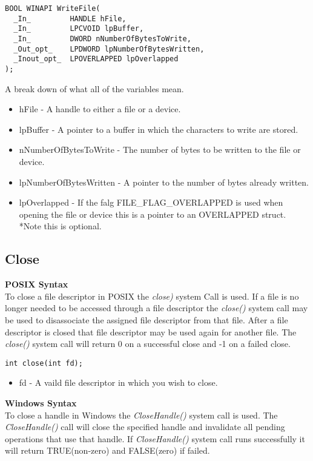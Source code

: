 \documentclass[letterpaper,10pt,notitlepage,fleqn]{article}
\begin{document}
\begin{verbatim}
BOOL WINAPI WriteFile(
  _In_         HANDLE hFile,
  _In_         LPCVOID lpBuffer,
  _In_         DWORD nNumberOfBytesToWrite,
  _Out_opt_    LPDWORD lpNumberOfBytesWritten,
  _Inout_opt_  LPOVERLAPPED lpOverlapped
);
\end{verbatim}

A break down of what all of the variables mean.

\begin{itemize}
\item hFile - A handle to either a file or a device.
\item lpBuffer - A pointer to a buffer in which the characters to write are stored.
\item nNumberOfBytesToWrite - The number of bytes to be written to the file or device.
\item lpNumberOfBytesWritten - A pointer to the number of bytes already written.
\item lpOverlapped - If the falg FILE\_FLAG\_OVERLAPPED is used when opening the file or device this is a pointer to an OVERLAPPED struct. *Note this is optional.
\end{itemize}

\subsection{Close}
\textbf{POSIX Syntax} \\
To close a file descriptor in POSIX the \textit{close)} system Call is used. If a file is no longer needed to be accessed through a file descriptor the \textit{close()} system call may be used to disassociate the assigned file descriptor from that file. After a file descriptor is closed that file descriptor may be used again for another file. The \textit{close()} system call will return 0 on a successful close and -1 on a failed close.

\begin{verbatim}
int close(int fd);
\end{verbatim}

\begin{itemize}
\item fd - A vaild file descriptor in which you wish to close.
\end{itemize}

\textbf{Windows Syntax} \\
To close a handle in Windows the \textit{CloseHandle()} system call is used. The \textit{CloseHandle()} call will close the specified handle and invalidate all pending operations that use that handle. If \textit{CloseHandle()} system call runs successfully it will return TRUE(non-zero) and FALSE(zero) if failed.
\end{document}
